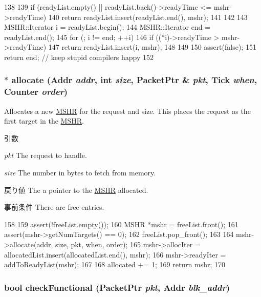 \begin{DoxyCode}
138 {
139     if (readyList.empty() || readyList.back()->readyTime <= mshr->readyTime) {
140         return readyList.insert(readyList.end(), mshr);
141     }
142 
143     MSHR::Iterator i = readyList.begin();
144     MSHR::Iterator end = readyList.end();
145     for (; i != end; ++i) {
146         if ((*i)->readyTime > mshr->readyTime) {
147             return readyList.insert(i, mshr);
148         }
149     }
150     assert(false);
151     return end;  // keep stupid compilers happy
152 }
\end{DoxyCode}
\hypertarget{classMSHRQueue_a5215a381ac6546c5ef5730b060b38e61}{
\subsubsection[{allocate}]{ $\ast$ allocate ({\bf Addr} {\em addr}, \/  int {\em size}, \/  {\bf PacketPtr} \& {\em pkt}, \/  {\bf Tick} {\em when}, \/  {\bf Counter} {\em order})}}
\label{classMSHRQueue_a5215a381ac6546c5ef5730b060b38e61}
Allocates a new \hyperlink{classMSHR}{MSHR} for the request and size. This places the request as the first target in the \hyperlink{classMSHR}{MSHR}. 
\begin{DoxyParams}{引数}
\item[{\em pkt}]The request to handle. \item[{\em size}]The number in bytes to fetch from memory. \end{DoxyParams}
\begin{DoxyReturn}{戻り値}
The a pointer to the \hyperlink{classMSHR}{MSHR} allocated.
\end{DoxyReturn}
\begin{DoxyPrecond}{事前条件}
There are free entries. 
\end{DoxyPrecond}



\begin{DoxyCode}
158 {
159     assert(!freeList.empty());
160     MSHR *mshr = freeList.front();
161     assert(mshr->getNumTargets() == 0);
162     freeList.pop_front();
163 
164     mshr->allocate(addr, size, pkt, when, order);
165     mshr->allocIter = allocatedList.insert(allocatedList.end(), mshr);
166     mshr->readyIter = addToReadyList(mshr);
167 
168     allocated += 1;
169     return mshr;
170 }
\end{DoxyCode}
\hypertarget{classMSHRQueue_ab1a1044e709a5b00c99cf14430b3ff53}{
\subsubsection[{checkFunctional}]{\setlength{\rightskip}{0pt plus 5cm}bool checkFunctional ({\bf PacketPtr} {\em pkt}, \/  {\bf Addr} {\em blk\_\-addr})}}
\label{classMSHRQueue_ab1a1044e709a5b00c99cf14430b3ff53}



